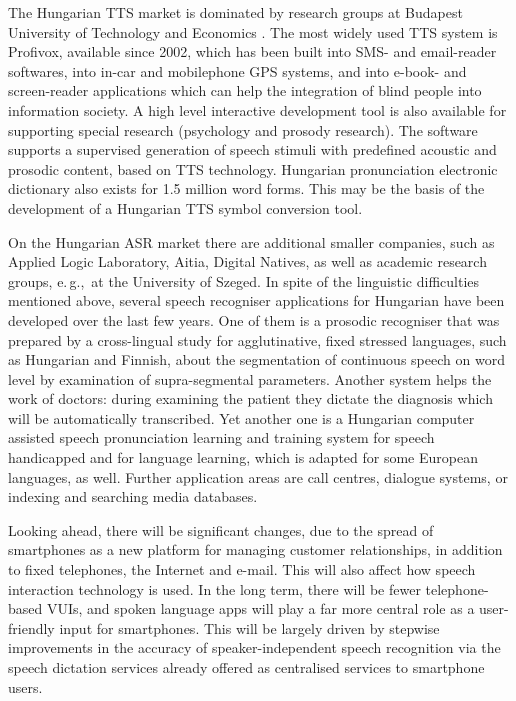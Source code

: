 \begin{multicols}{2}
The Hungarian TTS market is dominated by research groups at Budapest University of Technology and Economics \cite{bme}. The most widely used TTS system is Profivox, available since 2002, which has been built into SMS- and email-reader softwares, into in-car and mobilephone GPS systems, and into e-book- and screen-reader applications which can help the integration of blind people into information society. A high level interactive development tool is also available for supporting special research (psychology and prosody research). The software supports a supervised generation of speech stimuli with predefined acoustic and prosodic content, based on TTS technology. Hungarian pronunciation electronic dictionary also exists for 1.5 million word forms. This may be the basis of the development of a Hungarian TTS symbol conversion tool.

On the Hungarian ASR market there are additional smaller companies, such as Applied Logic Laboratory, Aitia, Digital Natives, as well as academic research groups, e.\,g.,~at the University of Szeged. In spite of the linguistic difficulties mentioned above, several speech recogniser applications for Hungarian have been developed over the last few years. One of them is a prosodic recogniser that was prepared by a cross-lingual study for agglutinative, fixed stressed languages, such as Hungarian and Finnish, about the segmentation of continuous speech on word level by examination of supra-segmental parameters. Another system helps the work of doctors: during examining the patient they dictate the diagnosis which will be automatically transcribed. Yet another one is a Hungarian computer assisted speech pronunciation learning and training system for speech handicapped and for language learning, which is adapted for some European languages, as well. Further application areas are call centres, dialogue systems, or indexing and searching media databases. 

Looking ahead, there will be significant changes, due to the spread of smartphones as a new platform for managing customer relationships, in addition to fixed telephones, the Internet and e-mail. This will also affect how speech interaction technology is used. In the long term, there will be fewer telephone-based VUIs, and spoken language apps will play a far more central role as a user-friendly input for smartphones. This will be largely driven by stepwise improvements in the accuracy of speaker-independent speech recognition via the speech dictation services already offered as centralised services to smartphone users.


\end{multicols}
